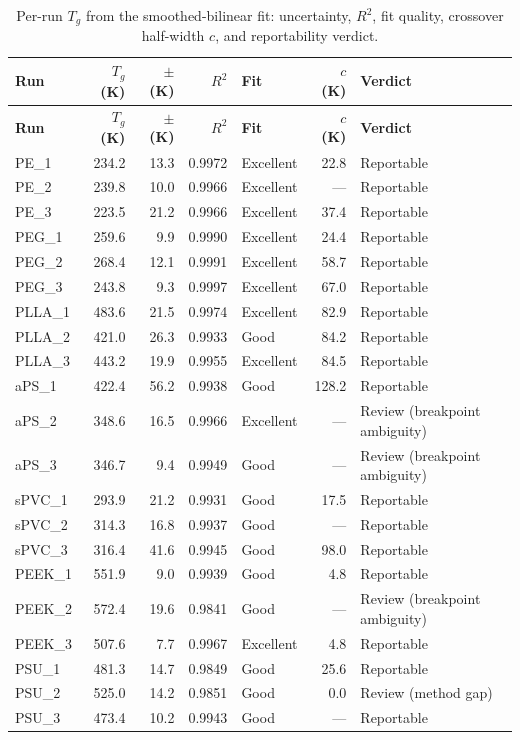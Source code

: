 \scriptsize
\begin{longtable}{l r r r l r l}
\caption{Per-run $T_g$ from the smoothed-bilinear fit: uncertainty, $R^2$, fit quality, crossover half-width $c$, and reportability verdict.} \label{tab:si_tg} \\
\toprule
\textbf{Run} & \textbf{$T_g$ (K)} & \textbf{$\pm$ (K)} & \textbf{$R^2$} & \textbf{Fit} & \textbf{$c$ (K)} & \textbf{Verdict} \\
\midrule
\endfirsthead
\toprule
\textbf{Run} & \textbf{$T_g$ (K)} & \textbf{$\pm$ (K)} & \textbf{$R^2$} & \textbf{Fit} & \textbf{$c$ (K)} & \textbf{Verdict} \\
\midrule
\endhead
\bottomrule
\endfoot
PE\_1 & 234.2 & 13.3 & 0.9972 & Excellent & 22.8 & Reportable \\
PE\_2 & 239.8 & 10.0 & 0.9966 & Excellent & --- & Reportable \\
PE\_3 & 223.5 & 21.2 & 0.9966 & Excellent & 37.4 & Reportable \\
PEG\_1 & 259.6 & 9.9 & 0.9990 & Excellent & 24.4 & Reportable \\
PEG\_2 & 268.4 & 12.1 & 0.9991 & Excellent & 58.7 & Reportable \\
PEG\_3 & 243.8 & 9.3 & 0.9997 & Excellent & 67.0 & Reportable \\
PLLA\_1 & 483.6 & 21.5 & 0.9974 & Excellent & 82.9 & Reportable \\
PLLA\_2 & 421.0 & 26.3 & 0.9933 & Good & 84.2 & Reportable \\
PLLA\_3 & 443.2 & 19.9 & 0.9955 & Excellent & 84.5 & Reportable \\
aPS\_1 & 422.4 & 56.2 & 0.9938 & Good & 128.2 & Reportable \\
aPS\_2 & 348.6 & 16.5 & 0.9966 & Excellent & --- & Review (breakpoint ambiguity) \\
aPS\_3 & 346.7 & 9.4 & 0.9949 & Good & --- & Review (breakpoint ambiguity) \\
sPVC\_1 & 293.9 & 21.2 & 0.9931 & Good & 17.5 & Reportable \\
sPVC\_2 & 314.3 & 16.8 & 0.9937 & Good & --- & Reportable \\
sPVC\_3 & 316.4 & 41.6 & 0.9945 & Good & 98.0 & Reportable \\
PEEK\_1 & 551.9 & 9.0 & 0.9939 & Good & 4.8 & Reportable \\
PEEK\_2 & 572.4 & 19.6 & 0.9841 & Good & --- & Review (breakpoint ambiguity) \\
PEEK\_3 & 507.6 & 7.7 & 0.9967 & Excellent & 4.8 & Reportable \\
PSU\_1 & 481.3 & 14.7 & 0.9849 & Good & 25.6 & Reportable \\
PSU\_2 & 525.0 & 14.2 & 0.9851 & Good & 0.0 & Review (method gap) \\
PSU\_3 & 473.4 & 10.2 & 0.9943 & Good & --- & Reportable \\
\end{longtable}
\normalsize
